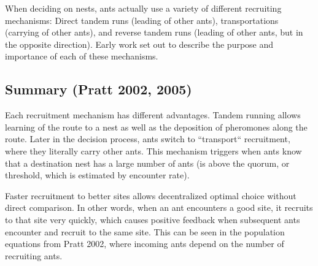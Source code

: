 \documentclass[letterpaper]{article}
\makeatletter
\def\mcolor#1#{\@mcolor{#1}}
\def\@mcolor#1#2#3{%
  \protect\leavevmode
  \begingroup
    \color#1{#2}#3%
  \endgroup
}
\newcommand{\sitem}[1]
{
    \begin{itemize}
        \item #1
    \end{itemize}
}
\makeatother
\begin{document}

When deciding on nests, ants actually use a variety of different recruiting mechanisms: Direct tandem runs (leading of other ants), transportations (carrying of other ants), and reverse tandem runs (leading of other ants, but in the opposite direction). 
Early work set out to describe the purpose and importance of each of these mechanisms.

\subsection{Summary (Pratt 2002, 2005)}

Each recruitment mechanism has different advantages. Tandem running allows learning of the route to a nest as well as the deposition of pheromones along the route. 
Later in the decision process, ants switch to ``transport`` recruitment, where they literally carry other ants. 
This mechanism triggers when ants know that a destination nest has a large number of ants (is above the quorum, or threshold, which is estimated by encounter rate).

Faster recruitment to better sites allows decentralized optimal choice without direct comparison.
In other words, when an ant encounters a good site, it recruits to that site very quickly, which causes positive feedback when subsequent ants encounter and recruit to the same site.
This can be seen in the population equations from Pratt 2002, where incoming ants depend on the number of recruiting ants.
\end{document}
